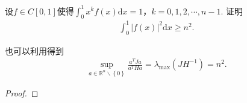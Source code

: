\documentclass[../../main.tex]{subfiles}%
\begin{document}
\begin{proposition}\label{proposition:Hilbert矩阵性质的应用1}
设$f\in C[0,1]$使得$\int_{0}^{1}x^{k}f(x)\mathrm{d}x = 1$，$k = 0,1,2,\cdots,n - 1$. 证明
\begin{align*}
\int_{0}^{1}|f(x)|^{2}\mathrm{d}x\geqslant n^{2}.
\end{align*}
\end{proposition}
\begin{note}
也可以利用得到\begin{align*}
\mathop {\mathrm{sup}} \limits_{a\in \mathbb{R} ^n\backslash \left\{ 0 \right\}}\frac{a^TJa}{a^THa}=\lambda _{\max}\left( JH^{-1} \right) =n^2.
\end{align*}
\end{note}
\begin{proof}


\end{proof}
\end{document}

